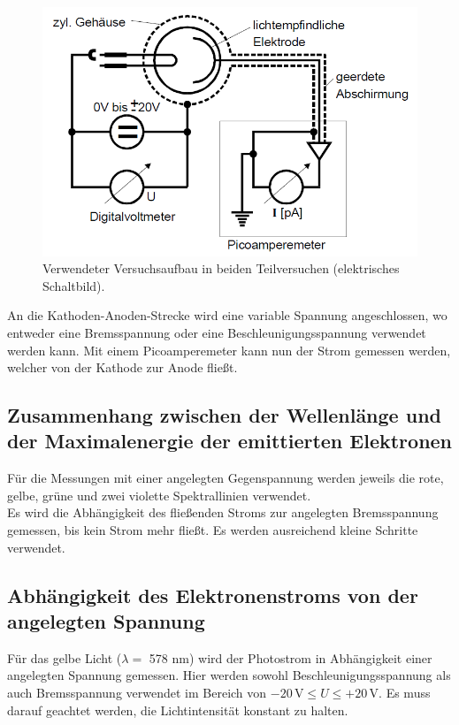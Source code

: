 \begin{figure}
    \centering
    \includegraphics[width=15cm]{Bilder/StromZeug.png}
    \caption{Verwendeter Versuchsaufbau in beiden Teilversuchen (elektrisches Schaltbild).\cite{sample}}
    \label{Abb:StromZeug}
\end{figure}

An die Kathoden-Anoden-Strecke wird eine variable Spannung angeschlossen, wo entweder eine Bremsspannung
oder eine Beschleunigungsspannung verwendet werden kann. Mit einem Picoamperemeter kann nun der Strom 
gemessen werden, welcher von der Kathode zur Anode fließt.

\subsection{Zusammenhang zwischen der Wellenlänge und der Maximalenergie der emittierten Elektronen}

Für die Messungen mit einer angelegten Gegenspannung werden jeweils die rote, gelbe, grüne und zwei
violette Spektrallinien verwendet.\\
Es wird die Abhängigkeit des fließenden Stroms zur angelegten Bremsspannung gemessen, bis kein Strom 
mehr fließt. Es werden ausreichend kleine Schritte verwendet.

\subsection{Abhängigkeit des Elektronenstroms von der angelegten Spannung}

Für das gelbe Licht ($\lambda = $ 578 nm) wird der Photostrom in Abhängigkeit einer angelegten Spannung gemessen. Hier werden sowohl
Beschleunigungsspannung als auch Bremsspannung verwendet im Bereich von $- 20 \, \mathrm{V} \leq U \leq + 20 \, \mathrm{V}$.
Es muss darauf geachtet werden, die Lichtintensität konstant zu halten.

\newpage